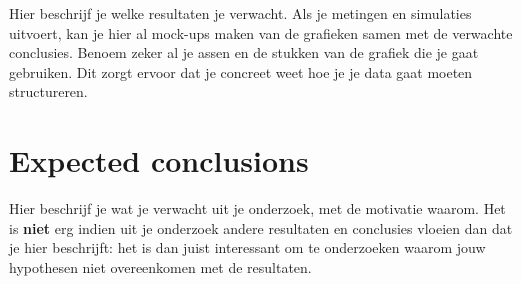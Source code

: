 Hier beschrijf je welke resultaten je verwacht. Als je metingen en simulaties uitvoert, kan je hier al mock-ups maken van de grafieken samen met de verwachte conclusies. Benoem zeker al je assen en de stukken van de grafiek die je gaat gebruiken. Dit zorgt ervoor dat je concreet weet hoe je je data gaat moeten structureren.

\section{Expected conclusions}
\label{sec:verwachte_conclusies}

Hier beschrijf je wat je verwacht uit je onderzoek, met de motivatie waarom. Het is \textbf{niet} erg indien uit je onderzoek andere resultaten en conclusies vloeien dan dat je hier beschrijft: het is dan juist interessant om te onderzoeken waarom jouw hypothesen niet overeenkomen met de resultaten.

